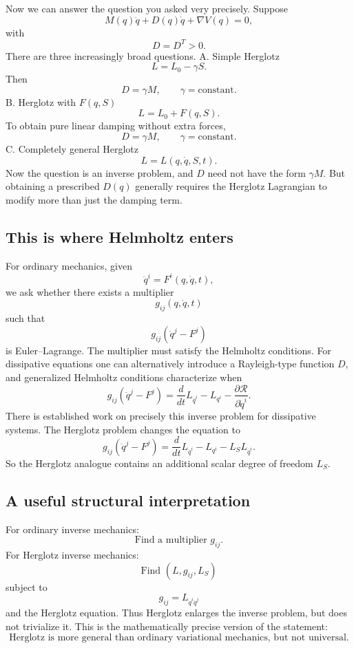 Now we can answer the question you asked very precisely.
Suppose
\begin{equation}
 \boxed{ M(q)\ddot q+D(q)\dot q+\nabla V(q)=0, } \tag{14} 
\end{equation}
with
$$ D=D^T>0. $$
There are three increasingly broad questions.
A. Simple Herglotz
$$ L=L_0-\gamma S. $$
Then
$$ \boxed{ D=\gamma M,\qquad\gamma=\text{constant}. } $$
B. Herglotz with \(F(q,S)\)
$$ L=L_0+F(q,S). $$
To obtain pure linear damping without extra forces,
$$ \boxed{ D=\gamma M,\qquad\gamma=\text{constant}. } $$
C. Completely general Herglotz
$$ L=L(q,\dot q,S,t). $$
Now the question is an inverse problem, and \(D\) need not have the form \(\gamma M\).
But obtaining a prescribed \(D(q)\) generally requires the Herglotz Lagrangian to modify more than just the damping term.

\subsection{This is where Helmholtz enters}

For ordinary mechanics, given
$$ \ddot q^i=F^i(q,\dot q,t), $$
we ask whether there exists a multiplier
$$ g_{ij}(q,\dot q,t) $$
such that
$$ g_{ij}(\ddot q^j-F^j) $$
is Euler–Lagrange.
The multiplier must satisfy the Helmholtz conditions.
For dissipative equations one can alternatively introduce a Rayleigh-type function \(D\), and generalized Helmholtz conditions characterize when
$$ g_{ij}(\ddot q^j-F^j) = \frac{d}{dt}L_{\dot q^i} -L_{q^i} -\frac{\partial\mathcal R}{\partial\dot q^i}. $$
There is established work on precisely this inverse problem for dissipative systems.
The Herglotz problem changes the equation to
$$ g_{ij}(\ddot q^j-F^j) = \frac{d}{dt}L_{\dot q^i} -L_{q^i} -L_SL_{\dot q^i}. $$
So the Herglotz analogue contains an additional scalar degree of freedom \(L_S\).

\subsection{A useful structural interpretation}

For ordinary inverse mechanics:
$$ \boxed{ \text{Find a multiplier }g_{ij}. } $$
For Herglotz inverse mechanics:
$$ \boxed{ \text{Find }(L,g_{ij},L_S) } $$
subject to
$$ g_{ij}=L_{\dot q^i\dot q^j} $$
and the Herglotz equation.
Thus Herglotz enlarges the inverse problem, but does not trivialize it.
This is the mathematically precise version of the statement:
$$ \boxed{ \text{Herglotz is more general than ordinary variational mechanics, but not universal.} } $$

